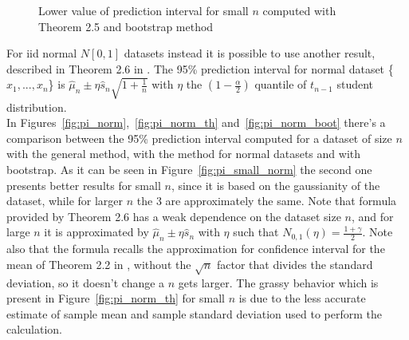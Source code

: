 \documentclass[10pt]{article}
\begin{document}
\begin{figure}[h!]
\centering
 	 \caption{Lower value of prediction interval for small $n$ computed with Theorem 2.5 and bootstrap method}
  \label{fig:pi_small_uni}
\end{figure}



For iid normal $N[0,1]$ datasets instead it is possible to use another result, described in Theorem 2.6 in \cite{leb}. The 95\% prediction interval for normal dataset \{$x_1, ... , x_n$\} is $\hat{\mu}_n \pm \eta \hat{s}_n \sqrt{1 + \frac{1}{n}}$ with $\eta$ the $(1-\frac{\alpha}{2})$ quantile of $t_{n-1}$ student distribution.\\
In Figures~\ref{fig:pi_norm},~\ref{fig:pi_norm_th} and~\ref{fig:pi_norm_boot} there's a comparison between the 95\% prediction interval computed for a dataset of size $n$ with the general method, with the method for normal datasets and with bootstrap. As it can be seen in Figure~\ref{fig:pi_small_norm} the second one presents better results for small $n$, since it is based on the gaussianity of the dataset, while for larger $n$ the 3 are approximately the same. Note that formula provided by Theorem 2.6 has a weak dependence on the dataset size $n$, and for large $n$ it is approximated by $\hat{\mu}_n \pm \eta \hat{s}_n$ with $\eta$ such that $N_{0,1}(\eta) = \frac{1+\gamma}{2}$. Note also that the formula recalls the approximation for confidence interval for the mean of Theorem 2.2 in \cite{leb}, without the $\sqrt{n}$ factor that divides the standard deviation, so it doesn't change a $n$ gets larger. The grassy behavior which is present in Figure~\ref{fig:pi_norm_th} for small $n$ is due to the less accurate estimate of sample mean and sample standard deviation used to perform the calculation.
\end{document}
